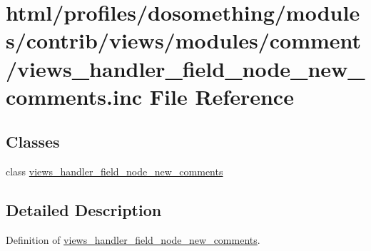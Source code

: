 \hypertarget{views__handler__field__node__new__comments_8inc}{
\section{html/profiles/dosomething/modules/contrib/views/modules/comment/views\_\-handler\_\-field\_\-node\_\-new\_\-comments.inc File Reference}
\label{views__handler__field__node__new__comments_8inc}
}
\subsection*{Classes}
\begin{DoxyCompactItemize}
\item 
class \hyperlink{classviews__handler__field__node__new__comments}{views\_\-handler\_\-field\_\-node\_\-new\_\-comments}
\end{DoxyCompactItemize}


\subsection{Detailed Description}
Definition of \hyperlink{classviews__handler__field__node__new__comments}{views\_\-handler\_\-field\_\-node\_\-new\_\-comments}. 